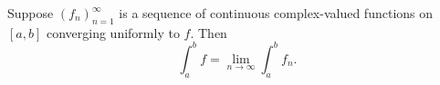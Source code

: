 Suppose $(f_n)_{n=1}^{\infty}$ is a sequence of continuous complex-valued functions on $[a, b]$ converging uniformly to $f$. Then
$$\int_a^b f = \lim_{n \to \infty} \int_a^b f_n.$$
